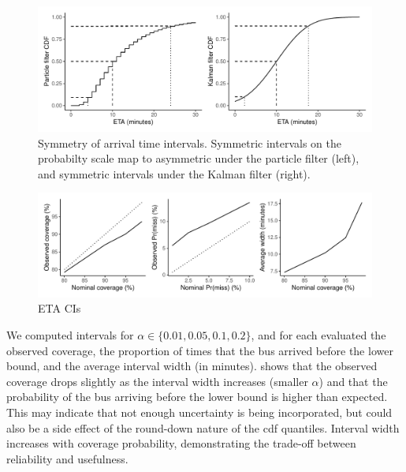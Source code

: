\begin{knitrout}\small
{}\color{fgcolor}\begin{figure}

{\centering \includegraphics[width=\textwidth]{figure/eta_dist_skew-1} 

}

\caption[Symmetry of arrival time intervals]{Symmetry of arrival time intervals. Symmetric intervals on the probabilty scale map to asymmetric under the particle filter (left), and symmetric intervals under the Kalman filter (right).}\label{fig:eta_dist_skew}
\end{figure}


\end{knitrout}


\begin{knitrout}\small
{}\color{fgcolor}\begin{figure}

{\centering \includegraphics[width=\textwidth]{figure/eta_cis-1} 

}

\caption[ETA CIs]{ETA CIs}\label{fig:eta_cis}
\end{figure}


\end{knitrout}



We computed intervals for $\alpha \in \{0.01, 0.05, 0.1, 0.2\}$, and for each evaluated the observed coverage, the proportion of times that the bus arrived before the lower bound, and the average interval width (in minutes).  shows that the observed coverage drops slightly as the interval width increases (smaller $\alpha$) and that the probability of the bus arriving before the lower bound is higher than expected. This may indicate that not enough uncertainty is being incorporated, but could also be a side effect of the round-down nature of the \gls{cdf} quantiles. Interval width increases with coverage probability, demonstrating the trade-off between reliability and usefulness.


